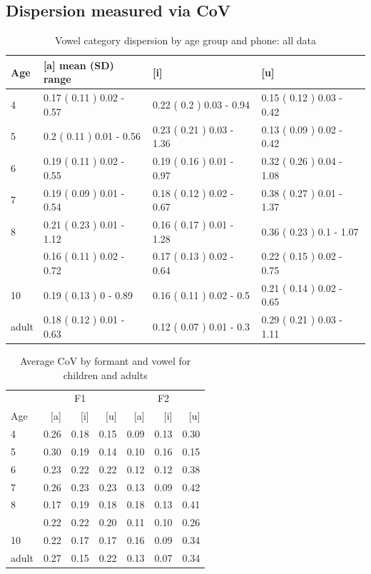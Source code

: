 \documentclass[
]{article}
\begin{document}
\hypertarget{dispersion-measured-via-cov}{%
\subsection{Dispersion measured via CoV}\label{dispersion-measured-via-cov}}

\begin{table}

\caption{\label{tab:delta-disp-tbl-group-alldata}Vowel category dispersion by age group and phone: all data}
\centering
\begin{tabular}[t]{llll}
\toprule
Age & [a] mean (SD) range & [i] & [u]\\
\midrule
4 & 0.17 ( 0.11 ) 0.02 - 0.57 & 0.22 ( 0.2 ) 0.03 - 0.94 & 0.15 ( 0.12 ) 0.03 - 0.42\\
5 & 0.2 ( 0.11 ) 0.01 - 0.56 & 0.23 ( 0.21 ) 0.03 - 1.36 & 0.13 ( 0.09 ) 0.02 - 0.42\\
6 & 0.19 ( 0.11 ) 0.02 - 0.55 & 0.19 ( 0.16 ) 0.01 - 0.97 & 0.32 ( 0.26 ) 0.04 - 1.08\\
7 & 0.19 ( 0.09 ) 0.01 - 0.54 & 0.18 ( 0.12 ) 0.02 - 0.67 & 0.38 ( 0.27 ) 0.01 - 1.37\\
8 & 0.21 ( 0.23 ) 0.01 - 1.12 & 0.16 ( 0.17 ) 0.01 - 1.28 & 0.36 ( 0.23 ) 0.1 - 1.07\\
\addlinespace
9 & 0.16 ( 0.11 ) 0.02 - 0.72 & 0.17 ( 0.13 ) 0.02 - 0.64 & 0.22 ( 0.15 ) 0.02 - 0.75\\
10 & 0.19 ( 0.13 ) 0 - 0.89 & 0.16 ( 0.11 ) 0.02 - 0.5 & 0.21 ( 0.14 ) 0.02 - 0.65\\
adult & 0.18 ( 0.12 ) 0.01 - 0.63 & 0.12 ( 0.07 ) 0.01 - 0.3 & 0.29 ( 0.21 ) 0.03 - 1.11\\
\bottomrule
\end{tabular}
\end{table}

\begin{table}[!h]

\caption{\label{tab:delta-disp-tbl-group}Average CoV by formant and vowel for children and adults}
\centering
\begin{tabular}[t]{lrrrrrr}
\toprule
\multicolumn{1}{c}{ } & \multicolumn{3}{c}{F1} & \multicolumn{3}{c}{F2} \\
\cmidrule(l{3pt}r{3pt}){2-4} \cmidrule(l{3pt}r{3pt}){5-7}
Age & [a] & [i] & [u] & [a]  & [i]  & [u] \\
\midrule
4 & 0.26 & 0.18 & 0.15 & 0.09 & 0.13 & 0.30\\
5 & 0.30 & 0.19 & 0.14 & 0.10 & 0.16 & 0.15\\
6 & 0.23 & 0.22 & 0.22 & 0.12 & 0.12 & 0.38\\
7 & 0.26 & 0.23 & 0.23 & 0.13 & 0.09 & 0.42\\
8 & 0.17 & 0.19 & 0.18 & 0.18 & 0.13 & 0.41\\
\addlinespace
9 & 0.22 & 0.22 & 0.20 & 0.11 & 0.10 & 0.26\\
10 & 0.22 & 0.17 & 0.17 & 0.16 & 0.09 & 0.34\\
adult & 0.27 & 0.15 & 0.22 & 0.13 & 0.07 & 0.34\\
\bottomrule
\end{tabular}
\end{table}
\end{document}
